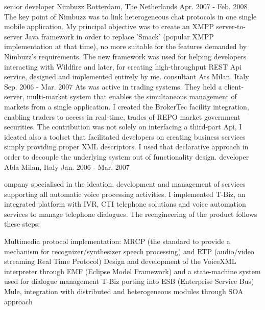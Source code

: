 \begin{cventries}
\cventry
  {senior developer} %
  {Nimbuzz} %
  {Rotterdam, The Netherlands} %
  {Apr. 2007 - Feb. 2008} %
  {
    The key point of Nimbuzz was to link heterogeneous chat protocols in one single mobile application.
    My principal objective was to create an XMPP server-to-server Java framework in order to replace 'Smack' (popular XMPP implementation at that time),
    no more suitable for the features demanded by Nimbuzz's requirements. The new framework was used for helping developers interacting with Wildfire and later,
    for creating high-throughput REST Api service, designed and implemented entirely by me.
  }
\cventry
  {consultant} %
  {Ats} %
  {Milan, Italy} %
  {Sep. 2006 - Mar. 2007} %
  {
    Ats was active in trading systems. They held a client-server, multi-market system that enables the simultaneous management of markets from a single application.
    I created the BrokerTec facility integration, enabling traders to access in real-time, trades of REPO market government securities.
    The contribution was not solely on interfacing a third-part Api, I ideated also a toolset that facilitated developers on creating business services
    simply providing proper XML descriptors. I used that declarative approach in order to decouple the underlying system out of functionality design.
  }
\cventry
  {developer} %
  {Abla} %
  {Milan, Italy} %
  {Jan. 2006 - Mar. 2007} %
  {

  ompany specialised in the ideation, development and management of services supporting all automatic voice processing activities.
  I implemented T-Biz, an integrated platform with IVR, CTI telephone solutions and voice automation services to manage telephone dialogues.
  The reengineering of the product follows these steps:

Multimedia protocol implementation: MRCP (the standard to provide a mechanism for recognizer/synthesizer speech processing) and RTP (audio/video streaming Real Time Protocol)
Design and development of the VoiceXML interpreter through EMF (Eclipse Model Framework) and a state-machine system used for dialogue management
T-Biz porting into ESB (Enterprise Service Bus) Mule, integration with distributed and heterogeneous modules through SOA approach
  }
\end{cventries}
